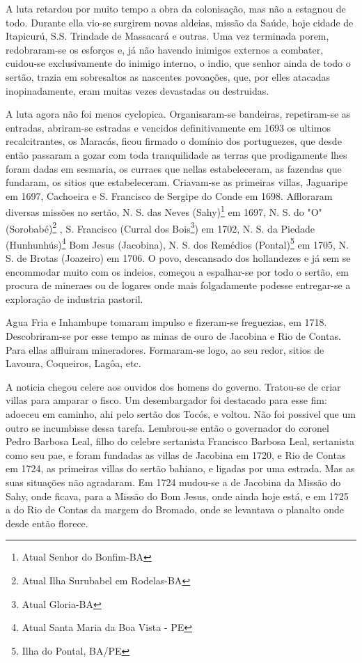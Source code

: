  A luta retardou por muito tempo a obra da colonisação, mas não  a estagnou de todo. Durante ella vio-se surgirem novas aldeias, missão da Saúde, hoje cidade  de Itapicurú, S.S. Trindade de Massacará e outras. Uma vez terminada porem, redobraram-se os esforços e, já não havendo inimigos externos a combater, cuidou-se exclusivamente do inimigo interno, o indio, que senhor ainda de todo o sertão, trazia em sobresaltos as nascentes povoações, que, por elles atacadas inopinadamente, eram muitas vezes devastadas ou destruidas.
 
 A luta agora não foi menos cyclopica. Organisaram-se bandeiras, repetiram-se as entradas, abriram-se  estradas e vencidos definitivamente em 1693 os ultimos recalcitrantes, os Maracás, ficou firmado o domínio dos portuguezes, que desde então passaram a  gozar com toda tranquilidade as terras que prodigamente lhes foram dadas em sesmaria, os curraes que nellas estabeleceram, as fazendas que fundaram, os sitios  que estabeleceram. Criavam-se as primeiras villas, Jaguaripe em  1697, Cachoeira e S. Francisco de Sergipe do Conde em 1698. Affloraram diversas missões no sertão,
  N. S. das Neves (Sahy)\footnote{Atual Senhor do Bonfim-BA} %
 em 1697, N. S. do "O" (Sorobabé)\footnote{Atual Ilha Surubabel em Rodelas-BA}%
 , S.  Francisco (Curral dos Bois\footnote{Atual Gloria-BA})%
  em 1702, N. S. da Piedade (Hunhunhús)\footnote{Atual Santa Maria da Boa Vista - PE} %
  Bom Jesus (Jacobina), %
  N. S. dos Remédios (Pontal)\footnote{Ilha do Pontal, BA/PE} %
  em 1705, N. S. de Brotas (Joazeiro) %
 em 1706. O povo, descansado dos  hollandezes e já sem se encommodar muito com os indeios, começou a espalhar-se por todo o sertão, em procura de mineraes ou de logares onde  mais folgadamente podesse entregar-se a exploração de industria pastoril.
 
 Agua Fria e  Inhambupe tomaram impulso e fizeram-se freguezias, em 1718. Descobriram-se por esse tempo as minas de ouro de Jacobina e Rio de Contas. Para ellas affluiram mineradores. Formaram-se logo, ao seu redor, sitios de Lavoura, Coqueiros, Lagôa, etc.
 
 A noticia chegou celere aos ouvidos dos  homens do governo. Tratou-se de criar  villas para amparar o fisco. Um desembargador foi destacado para esse fim: adoeceu em caminho, ahi pelo sertão dos Tocós, e voltou. Não foi possivel que um outro se  incumbisse dessa tarefa. Lembrou-se então o governador do coronel Pedro Barbosa Leal, filho do celebre sertanista Francisco Barbosa Leal, sertanista como  seu pae, e foram fundadas as villas de Jacobina em 1720, e Rio de Contas em 1724, as primeiras villas do sertão bahiano, e ligadas por uma estrada. Mas as suas  situações  não agradaram. Em 1724 mudou-se a de Jacobina  da Missão do Sahy, onde ficava, para a Missão do Bom Jesus,  onde ainda hoje está, e em 1725 a do Rio de Contas da margem do Bromado, onde se levantava o planalto  onde desde então florece.
 

